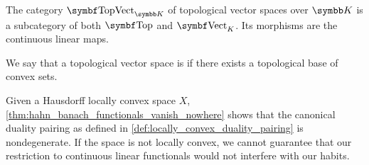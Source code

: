 \begin{definition}\label{def:category_of_topological_vector_spaces}
  The category \( \Cat{TopVect}_{\K} \) of topological vector spaces over \( \K \) is a subcategory of both \( \Cat{Top} \) and \( \Cat{Vect}_K \). Its morphisms are the continuous linear maps.
\end{definition}

\begin{definition}\label{def:locally_convex_space}\cite[1.8]{Rudin1991}
  We say that a topological vector space is  if there exists a topological base of convex sets.
\end{definition}

\begin{remark}\label{def:locally_convex_duality_pairing}
  Given a Hausdorff locally convex space \( X \), \cref{thm:hahn_banach_functionals_vanish_nowhere} shows that the canonical duality pairing as defined in \cref{def:locally_convex_duality_pairing} is nondegenerate. If the space is not locally convex, we cannot guarantee that our restriction to continuous linear functionals would not interfere with our habits.
\end{remark}
